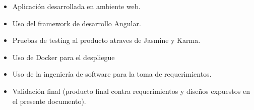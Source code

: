 \documentclass{article}
\begin{document}
\begin{itemize}
    \item Aplicación desarrollada en ambiente web.
    \item Uso del framework de desarrollo Angular.
    \item Pruebas de testing al producto atraves de Jasmine y Karma.
    \item Uso de Docker para el despliegue
    \item Uso de la ingeniería de software para la toma de requerimientos.
    \item Validación final (producto final contra requerimientos y diseños expuestos en el presente documento).
\end{itemize}
\end{document}
